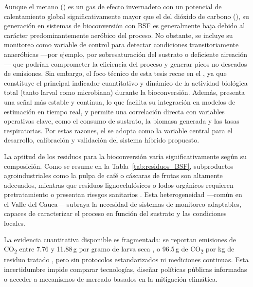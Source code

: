 Aunque el metano () es un gas de efecto invernadero con un potencial de calentamiento global significativamente mayor que el del dióxido de carbono (), su generación en sistemas de bioconversión con BSF es generalmente baja debido al carácter predominantemente aeróbico del proceso. No obstante, se incluye su monitoreo como variable de control para detectar condiciones transitoriamente anaeróbicas ---por ejemplo, por sobresaturación del sustrato o deficiente aireación--- que podrían comprometer la eficiencia del proceso y generar picos no deseados de emisiones. Sin embargo, el foco técnico de esta tesis recae en el , ya que constituye el principal indicador cuantitativo y dinámico de la actividad biológica total (tanto larval como microbiana) durante la bioconversión. Además, presenta una señal más estable y continua, lo que facilita su integración en modelos de estimación en tiempo real, y permite una correlación directa con variables operativas clave, como el consumo de sustrato, la biomasa generada y las tasas respiratorias. Por estas razones, el  se adopta como la variable central para el desarrollo, calibración y validación del sistema híbrido propuesto.

La aptitud de los residuos para la bioconversión varía significativamente según su composición. Como se resume en la Tabla~\ref{tab:residuos_BSF}, subproductos agroindustriales como la pulpa de café o cáscaras de frutas son altamente adecuados, mientras que residuos lignocelulósicos o lodos orgánicos requieren pretratamiento o presentan riesgos sanitarios \parencite{elsayedConversionProteinrichWaste2024,brunoValorizationOrganicWaste2025}. Esta heterogeneidad —común en el Valle del Cauca— subraya la necesidad de sistemas de monitoreo adaptables, capaces de caracterizar el proceso en función del sustrato y las condiciones locales.

La evidencia cuantitativa disponible es fragmentada: se reportan emisiones de CO\textsubscript{2} entre 7.76 y 11.88\,g por gramo de larva seca \parencite{rossiEstimatingDynamicsGreenhouse2024}, o 96.5\,g de CO\textsubscript{2} por kg de residuo tratado \parencite{fuhrmannComprehensiveIndustryrelevantBlack2025}, pero sin protocolos estandarizados ni mediciones continuas. Esta incertidumbre impide comparar tecnologías, diseñar políticas públicas informadas o acceder a mecanismos de mercado basados en la mitigación climática.

